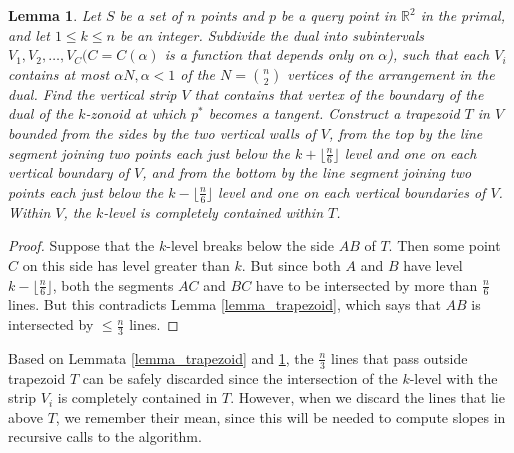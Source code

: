 \documentclass[charterfonts,lotsofwhite]{patmorin}
\newtheorem{lemma}{Lemma}
\newcommand{\comment}[1]{}
\begin{document}
\begin{lemma}\label{lemma_trapezoid_containment}
Let $S$ be a set of $n$ points and $p$ be a query point in $\mathbb{R}^2$ in the primal, and let $1 \le k \le n$ be an integer. Subdivide the dual into subintervals $V_1, V_2, \ldots, V_C (C = C(\alpha)$ is a function that depends only on $\alpha$), such that each $V_i$ contains at most $\alpha N, \alpha<1$ of the $N = {n \choose 2}$ vertices of the arrangement in the dual. Find the vertical strip $V$ that contains that vertex of the boundary of the dual of the $k$-zonoid at which $p^*$ becomes a tangent. Construct a trapezoid $T$ in $V$ bounded from the sides by the two vertical walls of $V$, from the top by the line segment joining two points each just below the $k+\lfloor\frac{n}{6}\rfloor$ level and one on each vertical boundary of $V$, and from the bottom by the line segment joining two points each just below the $k-\lfloor\frac{n}{6}\rfloor$ level and one on each vertical boundaries of $V$. Within $V$, the $k$-level is completely contained within $T$. 
\end{lemma}

\begin{proof}
Suppose that the $k$-level breaks below the side $AB$ of $T$. Then some point $C$ on this side has level greater than $k$. But since both $A$ and $B$ have level $k - \lfloor\frac{n}{6}\rfloor$, both the segments $AC$ and $BC$ have to be intersected by more than $\frac{n}{6}$ lines. But this contradicts Lemma \ref{lemma_trapezoid}, which says that $AB$ is intersected by $\le \frac{n}{3}$ lines. 
\end{proof}

Based on Lemmata \ref{lemma_trapezoid} and \ref{lemma_trapezoid_containment}, the $\frac{n}{3}$ lines that pass outside trapezoid $T$ can be safely discarded since the intersection of the $k$-level with the strip $V_i$ is completely contained in $T$. However, when we discard the lines that lie above $T$, we remember their mean, since this will be needed to compute slopes in recursive calls to the algorithm.

\comment{
It may be observed that until recently in our discussion, we were trying to find the vertex on the boundary of the dual of the $k$-zonoid at which line $p_1^*$ becomes a tangent. But above we show that it is the $k$-level that lies completely inside the trapezoid $T$ and the vertex point is being searched for on the $k$-level, not on the boundary of the dual of the $k$-zonoid. This is because, 
\begin{enumerate}
\item we do not explicitly construct the $k$-zonoid in the dual,
\item each vertex on the boundary of the dual of the $k$-zonoid is calculated by taking the mean of the $k$ lines above a $k$-level vertex,
\item even though we disregard lines above and passing outside the trapezoid $T$, their equations can be associated with each $k$-level vertex and the corresponding $k$-zonoid dual vertex be computed, as need arises.  
\end{enumerate}
}
\end{document}
